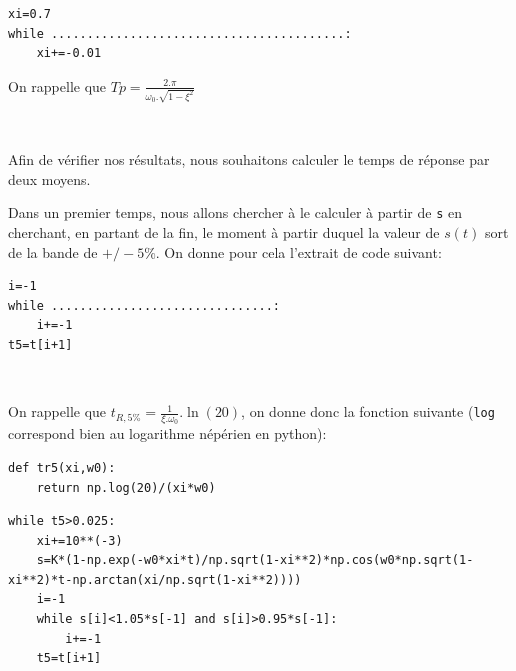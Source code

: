
\begin{center}
\begin{verbatim}
xi=0.7
while .........................................:
    xi+=-0.01
\end{verbatim}
\end{center}

On rappelle que $Tp=\frac{2.\pi}{\omega_0.\sqrt{1-\xi^2}}$


~\

Afin de vérifier nos résultats, nous souhaitons calculer le temps de réponse par deux moyens.

Dans un premier temps, nous allons chercher à le calculer à partir de \verb?s? en cherchant, en partant de la fin, le moment à partir duquel la valeur de $s(t)$ sort de la bande de $+/-5\%$. On donne pour cela l'extrait de code suivant:

\begin{center}
\begin{verbatim}
i=-1
while ...............................:
    i+=-1
t5=t[i+1]
\end{verbatim}
\end{center}


~\

On rappelle que $t_{R,5\%}=\frac{1}{\xi.\omega_0}.\ln(20)$, on donne donc la fonction suivante (\verb?log? correspond bien au logarithme népérien en python): 

\begin{center}
\begin{verbatim}
def tr5(xi,w0):
    return np.log(20)/(xi*w0)
\end{verbatim}
\end{center}
    


{\scriptsize
\begin{center}
\begin{verbatim}
while t5>0.025:
    xi+=10**(-3)
    s=K*(1-np.exp(-w0*xi*t)/np.sqrt(1-xi**2)*np.cos(w0*np.sqrt(1-xi**2)*t-np.arctan(xi/np.sqrt(1-xi**2))))
    i=-1
    while s[i]<1.05*s[-1] and s[i]>0.95*s[-1]:
        i+=-1
    t5=t[i+1]
\end{verbatim}
\end{center}}


